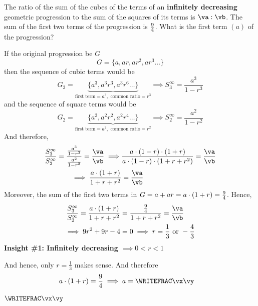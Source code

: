 

\FRACDIV\vc{}\va\vb
\FRACDIV\vc{}\vx\vy

\question[3] The ratio of the sum of the cubes of the terms of an \textbf{infinitely decreasing}
geometric progression to the sum of the squares of its terms is $\va:\vb$. The sum of the 
first two terms of the progression is $\frac{9}{4}$. What is the first term $(a)$ of the progression?

\watchout

\begin{solution}[\halfpage]
  If the original progression be $G$
  \[ G = \lbrace a,ar,ar^2,ar^3\ldots \rbrace \]
  then the sequence of cubic terms would be 
  \[ G_3 = \underbrace{\lbrace a^3, a^3r^3,a^3r^6\ldots \rbrace}_{\text{first term}=a^3,\text{ common ratio}=r^3}
  \implies S_3^\infty = \dfrac{a^3}{1-r^3} \]
  and the sequence of square terms would be 
  \[ G_2 = \underbrace{\lbrace a^2, a^2r^2,a^2r^4\ldots \rbrace}_{\text{first term}=a^2,\text{ common ratio}=r^2}
  \implies S_2^\infty = \dfrac{a^2}{1-r^2} \]
  And therefore, 
   \begin{align}
   		\dfrac{S_3^\infty}{S_2^\infty} = \dfrac{\frac{a^3}{1-r^3}}{\frac{a^2}{1-r^2}} = \dfrac\va\vb
   		\implies &\dfrac{a\cdot(1-r)\cdot(1+r)}{a\cdot(1-r)\cdot(1+r+r^2)} = \dfrac\va\vb \\
   		\implies\dfrac{a\cdot(1+r)}{1+r+r^2} &= \dfrac\va\vb 
   \end{align}
   Moreover, the sum of the first two terms in $G = a + ar = a\cdot (1+r) = \frac{9}{4}$. Hence, 
   \begin{align}
   		\dfrac{S_3^\infty}{S_2^\infty} = \dfrac{a\cdot (1+r)}{1+r+r^2} &= \dfrac{\frac\vc\vd}{1+r+r^2} = \dfrac\va\vb \\
      \implies 9 r^2 + 9 r - 4 &= 0\implies r = \frac{1}{3}\text{ or } -\frac{4}{3}
   \end{align}
   \textbf{Insight \#1: Infinitely decreasing $\implies 0 < r < 1$}

   And hence, only $r=\frac{1}{3}$ makes sense.
   And therefore 
   \begin{align}
   	a\cdot(1+r) &= \dfrac\vc\vd \implies a = \WRITEFRAC\vx\vy
   \end{align}
\end{solution}
\ifprintanswers\begin{codex}$\WRITEFRAC\vx\vy$\end{codex}\fi
